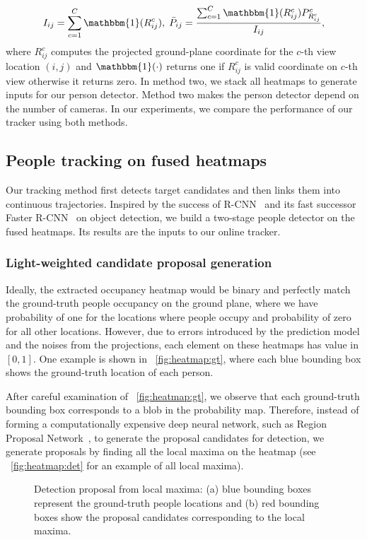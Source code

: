 \documentclass{article}
\begin{document}
\begin{equation}
I_{ij}  = \sum_{c=1}^C \mathbbm{1}( R^c_{ij} ), \;
\bar{P}_{ij} = \frac{\sum_{c=1}^C \mathbbm{1}( R^c_{ij} ) P^c_{R^c_{ij}} } {I_{ij}},
\end{equation}
where $R^c_{ij}$ computes the projected ground-plane coordinate for the $c$-th view location $(i,j)$  and $\mathbbm{1}(\cdot)$ returns one if $R^c_{ij}$ is valid coordinate on
$c$-th view otherwise it returns zero.
In method two, we stack all heatmaps to generate inputs for our person detector. Method two makes the person detector depend on the number of cameras.
In our experiments, we compare the performance of our tracker using both methods.


\subsection{People tracking on fused heatmaps}
\label{sec:tracking}
Our tracking method first detects target candidates and then links them into continuous trajectories.
Inspired by the success of R-CNN~\cite{Girshick_2014_CVPR} and its fast successor Faster R-CNN~\cite{ren2015faster} on object detection,
we build a two-stage people detector on the fused heatmaps. Its results are the inputs to our online tracker.
\subsubsection{Light-weighted candidate proposal generation}
Ideally, the extracted occupancy heatmap would be binary and perfectly match
the ground-truth people occupancy on the ground plane, where we have probability of one for the locations where people occupy and probability of zero for all other locations. However, due to errors introduced by the prediction model and the noises
from the projections, each element on these heatmaps has value in $[0,1]$. One example is shown in \figurename~{\ref{fig:heatmap:gt}}, where each blue bounding box shows the ground-truth location of each person.

After careful examination of \figurename{~\ref{fig:heatmap:gt}}, we observe that each ground-truth bounding box corresponds to a blob in the probability map.
Therefore, instead of forming a computationally expensive deep neural network, such as Region Proposal Network~\cite{ren2015faster}, to generate the proposal candidates for detection, we generate proposals by finding all the local maxima on the heatmap (see \figurename{~\ref{fig:heatmap:det}} for an example of all local maxima).
\begin{figure}
	\begin{center}
	\end{center}
   	\caption{Detection proposal from local maxima: (a) blue bounding boxes represent the ground-truth people locations and (b) red bounding boxes show the proposal candidates corresponding to the local maxima.}
	\label{fig:heatmap}
\end{figure}
\end{document}
